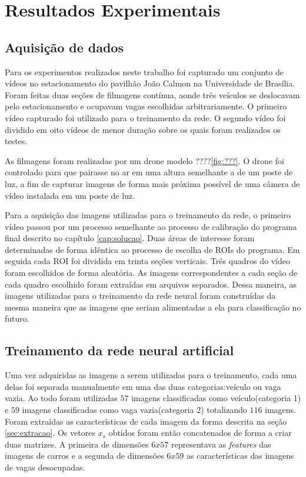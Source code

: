 \chapter{Resultados Experimentais}\label{cap:results}

\section{Aquisição de dados}

Para os experimentos realizados neste trabalho foi capturado um conjunto de vídeos no estacionamento do pavilhão João Calmon na Universidade de Brasília. Foram feitas duas seções de filmagens contínua, aonde três veículos se deslocavam pelo estacionamento e ocupavam vagas escolhidas arbitrariamente. O primeiro vídeo capturado foi utilizado para o treinamento da rede. O segundo vídeo foi dividido em oito vídeos de menor duração sobre os quais foram realizados os testes.

As filmagens foram realizadas por um drone modelo ????\ref{fig:???}. O drone foi controlado para que pairasse no ar em uma altura semelhante a de um poste de luz, a fim de capturar imagens de forma mais próxima possível de uma câmera de vídeo instalada em um poste de luz.


Para a aquisição das imagens utilizadas para o treinamento da rede, o primeiro vídeo passou por um processo semelhante ao processo de calibração do programa final descrito no capítulo \ref{cap:solucao}. Duas áreas de interesse foram determinadas de forma idêntica ao processo de escolha de ROIs do programa. Em seguida cada ROI foi dividida em trinta seções verticais. Três quadros do vídeo foram escolhidos de forma aleatória. As imagens correspondentes a cada seção de cada quadro escolhido foram extraídas em arquivos separados. Dessa maneira, as imagens utilizadas para o treinamento da rede neural foram construídas da mesma maneira que as imagens que seriam alimentadas a ela para classificação no futuro.

\section{Treinamento da rede neural artificial}

Uma vez adquiridas as imagens a serem utilizadas para o treinamento, cada uma delas foi separada manualmente em uma das duas categorias:veículo ou vaga vazia. Ao todo foram utilizadas $57$ imagens classificadas como veículo(categoria 1) e $59$ imagens classificadas como vaga vazia(categoria 2) totalizando $116$ imagens. Foram extraídas as características de cada imagem da forma descrita na seção \ref{sec:extracao}. Os vetores $x_s$ obtidos foram então concatenados de forma a criar duas matrizes. A primeira de dimensões $6x57$ representava as \textit{features} das imagens de carros e a segunda de dimensões $6x59$ as características das imagens de vagas desocupadas.

